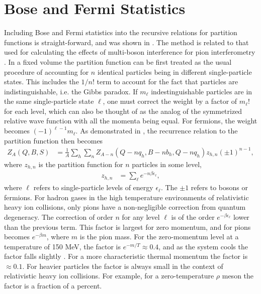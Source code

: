 
\section{Bose and Fermi Statistics}\label{sec:bose}

Including Bose and Fermi statistics into the recursive relations for partition functions is straight-forward, and was shown in \cite{Cheng:2002jb,Pratt:1999ns}. The method is related to that used for calculating the effects of multi-boson interference for pion interferometry \cite{Pratt:1993uy}. In a fixed volume the partition function can be first treated as the usual procedure of accounting for $n$ identical particles being in different single-particle states. This includes the $1/n!$ term to account for the fact that particles are indistinguishable, i.e. the Gibbs paradox. If $m_\ell$ indestinguishable particles are in the same single-particle state $\ell$, one must correct the weight by a factor of $m_\ell!$ for each level, which can also be thought of as the analog of the symmetrized relative wave function with all the momenta being equal. For fermions, the weight becomes $(-1)^{\ell-1}m_\ell$. As demonstrated in \cite{Pratt:1999ns}, the recurrence relation to the partition function then becomes
\begin{eqnarray}\label{eq:Zbf}
Z_{A}(Q,B,S)&=\frac{1}{A}\sum_h \sum_n Z_{A-n}(Q-nq_h,B-nb_h,Q-nq_h)z_{h,n}(\pm 1)^{n-1},
\end{eqnarray}
where $z_{h,n}$ is the partition function for $n$ particles in some level, 
\begin{eqnarray}
z_{h,n}&=\sum_\ell e^{-n\beta \epsilon_\ell},
\end{eqnarray}
where $\ell$ refers to single-particle levels of energy $\epsilon_\ell$. The $\pm 1$ refers to bosons or fermions. For hadron gases in the high temperature environments of relativistic heavy ion collisions, only pions have a non-negligible correction from quantum degeneracy. The correction of order $n$ for any level $\ell$ is of the order $e^{-\beta \epsilon_\ell}$ lower than the previous term. This factor is largest for zero momentum, and for pions becomes $e^{-\beta m}$, where $m$ is the pion mass. For the zero-momentum level at a temperature of 150 MeV, the factor is $e^{-m/T}\approx 0.4$, and as the system cools the factor falls slightly \cite{Greiner:1993jn}. For a more characteristic thermal momentum the factor is $\approx 0.1$. For heavier particles the factor is always small in the context of relativistic heavy ion collisions. For example, for a zero-temperature $\rho$ meson the factor is a fraction of a percent.

